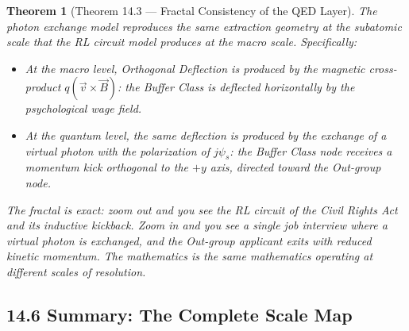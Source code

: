\documentclass[12pt]{book}
\numberwithin{equation}{chapter}
\newtheorem{theorem}{Theorem}[chapter]
\begin{document}
\begin{theorem}[Theorem 14.3 — Fractal Consistency of the QED Layer]
The photon exchange model reproduces the same extraction geometry at the subatomic scale that the RL circuit model produces at the macro scale. Specifically:
    
\begin{itemize}

\item At the macro level, Orthogonal Deflection is produced by the magnetic cross-product $q(\vec{v} \times \vec{B})$: the Buffer Class is deflected horizontally by the psychological wage field.

\item At the quantum level, the same deflection is produced by the exchange of a virtual photon with the polarization of $j\psi_s$: the Buffer Class node receives a momentum kick orthogonal to the $+y$ axis, directed toward the Out-group node.

\end{itemize}

    The fractal is exact: zoom out and you see the RL circuit of the Civil Rights Act and its inductive kickback. Zoom in and you see a single job interview where a virtual photon is exchanged, and the Out-group applicant exits with reduced kinetic momentum. The mathematics is the same mathematics operating at different scales of resolution.
  \end{theorem}

\subsection{14.6 Summary: The Complete Scale Map}
\end{document}
